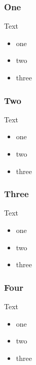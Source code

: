 \documentclass{beamer}
\begin{document}
\begin{frame} 
\frametitle{One}

Text

\begin{itemize}
\item one
\item two
\item three
\end{itemize}  

\end{frame}

\begin{frame} 
\frametitle{Two}

Text

\begin{itemize}
\item one
\item two
\item three
\end{itemize}  

\end{frame}

\begin{frame} 
\frametitle{Three}

Text

\begin{itemize}
\item one
\item two
\item three
\end{itemize}  

\end{frame}

\begin{frame} 
\frametitle{Four}

Text

\begin{itemize}
\item one
\item two
\item three
\end{itemize}  

\end{frame}
\end{document}
